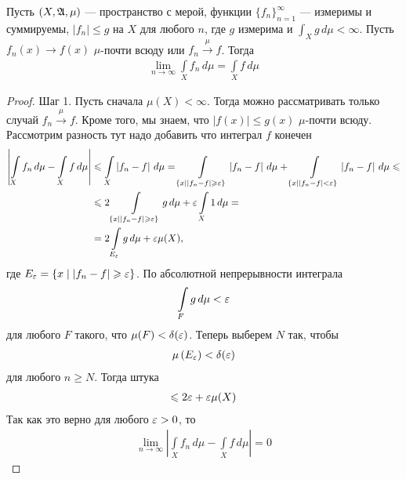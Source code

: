 \begin{thm}
 \label{theorem:lebesgue-majoring-convergence}
 Пусть $(X, \mathfrak{A}, \mu)$ --- пространство с мерой, функции $\{f_{n}\}_{n=1}^{\infty} $ --- измеримы и суммируемы, $\left| f_n \right| \leqslant g$ на $X$ для любого $n$, где $g$ измерима и $\int_{X} g \, d\mu < \infty $. Пусть $f_n(x) \to f(x)$ $\mu$-почти всюду или $f_n \xrightarrow{\mu} f$. Тогда \begin{align*}
  \lim_{n \to \infty} \int\limits_{X} f_n \, d\mu  = \int\limits_{X} f \, d\mu  
 \end{align*} 
\end{thm}
\begin{proof}
 Шаг 1. Пусть сначала $\mu(X) < \infty$. Тогда можно рассматривать только случай $f_n \xrightarrow{\mu} f$. Кроме того, мы знаем, что $\left| f(x) \right| \leqslant g(x)$ $\mu$-почти всюду. Рассмотрим разность тут надо добавить что интеграл $f$ конечен \begin{align*}
  \left| \int\limits_{X} f_n \, d\mu - \int\limits_{X} f \, d\mu \right|   &\leqslant \int\limits_{X} \left| f_n - f \right| \, d\mu  = \int\limits_{\left\{ x \mid \left| f_n - f \right| \geqslant \varepsilon \right\}} \left| f_n - f \right| \, d\mu  + \int\limits_{\left\{ x \mid \left| f_n - f \right| < \varepsilon \right\}} \left| f_n - f \right| \, d\mu   \leqslant \\
  &\leqslant 2 \int\limits_{\left\{ x \mid \left| f_n - f \right| \geqslant \varepsilon \right\}} g \, d\mu + \varepsilon \int\limits_{X} 1 \, d\mu    = \\
  &= 2 \int\limits_{E_{\varepsilon}} g \, d\mu  + \varepsilon \mu(X)
 ,\end{align*} где $E_{\varepsilon} = \left\{ x \mid \left| f_n - f \right| \geqslant \varepsilon \right\}$. По абсолютной непрерывности интеграла \begin{align*}
  \int\limits_{F} g \, d\mu < \varepsilon 
 \end{align*} для любого $F$ такого, что $\mu(F) < \delta(\varepsilon)$. Теперь выберем $N$ так, чтобы \begin{align*}
 \mu \left( E_{\varepsilon} \right) < \delta(\varepsilon)
 \end{align*} для любого $n\geqslant N$. Тогда штука \begin{align*}
  \leqslant 2\varepsilon + \varepsilon \mu(X)
 \end{align*} Так как это верно для любого $\varepsilon > 0$, то \begin{align*}
  \lim_{n \to \infty} \left| \int\limits_{X} f_n \, d\mu - \int\limits_{X} f \, d\mu    \right|  = 0
 \end{align*} 


\end{proof}
